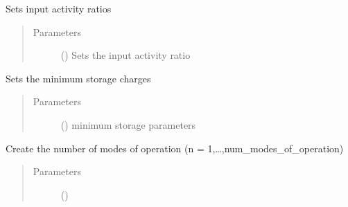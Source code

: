 \documentclass[a4paper,12pt,english]{article}
\begin{document}
\begin{fulllineitems}
\begin{fulllineitems}
\label{\detokenize{GOCPI:GOCPI.CreateCases.CreateCases.set_input_activity_ratio}}
Sets input activity ratios
\begin{quote}\begin{description}
\item[{Parameters}] \leavevmode
{} (\sphinxstyleliteralemphasis{\sphinxupquote{, }}) \textendash{} Sets the input activity ratio

\end{description}\end{quote}

\end{fulllineitems}


\begin{fulllineitems}
\label{\detokenize{GOCPI:GOCPI.CreateCases.CreateCases.set_min_storage_charge}}
Sets the minimum storage charges
\begin{quote}\begin{description}
\item[{Parameters}] \leavevmode
{} (\sphinxstyleliteralemphasis{\sphinxupquote{, }}) \textendash{} minimum storage parameters

\end{description}\end{quote}

\end{fulllineitems}


\begin{fulllineitems}
\label{\detokenize{GOCPI:GOCPI.CreateCases.CreateCases.set_mode_of_operation}}
Create the number of modes of operation (n = 1,…,num\_modes\_of\_operation)
\begin{quote}\begin{description}
\item[{Parameters}] \leavevmode
{} () \textendash{} 


\end{description}
\end{quote}
\end{fulllineitems}
\end{fulllineitems}
\end{document}
